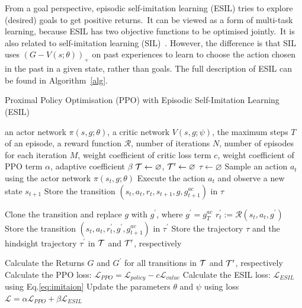 From a goal perspective, episodic self-imitation learning (ESIL) tries to explore (desired) goals to get positive returns.~It can be viewed as a form of multi-task learning, {because ESIL has two objective functions to be optimised jointly.}~It is also related to self-imitation learning (SIL)~\cite{oh2018self}. However, the difference is that SIL uses $\left(G-V(s;\theta)\right)_{+}$ on past experiences to learn to choose the action chosen in the past in a given state, rather than goals. The full description of ESIL can be found in Algorithm~\ref{alg}.
\begin{algorithm}[t!]
  \caption{Proximal Policy Optimisation (PPO) with Episodic Self-Imitation Learning (ESIL)}
  \label{alg}
  \begin{algorithmic}[1]
    \REQUIRE an actor network $\pi(s, g;\theta)$, a critic network $V(s, g;\psi)$, the maximum steps $T$ of an episode, a reward function $\mathcal{R}$, number of iterations $N$, number of episodes for each iteration $M$, weight coefficient of critic loss term $c$, weight coefficient of PPO term $\alpha$, adaptive coefficient $\beta$  
    \STATE $\mathcal{T} \leftarrow \varnothing$, $\mathcal{T}^{\prime} \leftarrow \varnothing$ 
    \STATE $\tau \leftarrow \varnothing$
    \STATE Sample an action $a_{t}$ using the actor network $\pi(s_{t}, g;\theta)$
    \STATE Execute the action $a_{t}$ and observe a new state $s_{t+1}$
    \STATE Store the transition $\left(s_{t}, a_{t}, r_{t}, s_{t+1}, g, g^{ac}_{t+1}\right)$ in $\tau$
    \ENDFOR

    \STATE Clone the transition and replace $g$ with $g^{\prime}$, where $g^{\prime}=g^{ac}_{T}$
    \STATE $r_{t}^{\prime}:=\mathcal{R}\left(s_{t}, a_{t}, g^{\prime}\right)$
    \STATE Store the transition $\left(s_{t}, a_{t}, r_{t}^{\prime}, g^{\prime}, g^{ac}_{t+1}\right)$ in $\tau^{\prime}$
    \ENDFOR
    \STATE Store the trajectory $\tau$ and the hindsight trajectory $\tau^{\prime}$ in $\mathcal{T}$ and $\mathcal{T}^{\prime}$, respectively 
    \ENDFOR

    \STATE Calculate the Returns $G$ and $G^{\prime}$ for all transitions in $\mathcal{T}$ and $\mathcal{T}^{\prime}$, respectively
    \STATE Calculate the PPO loss: $\mathcal{L}_{PPO} = \mathcal{L}_{policy} - c\mathcal{L}_{value}$
    \STATE Calculate the ESIL loss: $\mathcal{L}_{ESIL}$ using Eq.\eqref{eq:imitaion}
    \STATE Update the parameters $\theta$ and $\psi$ using loss $\mathcal{L}=\alpha\mathcal{L}_{PPO} + \beta\mathcal{L}_{ESIL}$
    \ENDFOR 
\end{algorithmic}
\end{algorithm}

